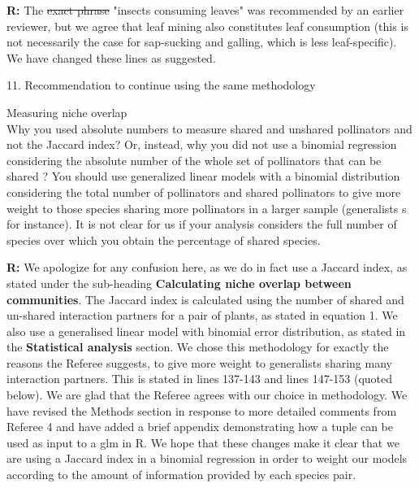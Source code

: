 \documentclass[12pt]{letter}
\newenvironment{refquote}{\bigskip \begin{it}}{\end{it}\smallskip}
\providecommand{\DIFadd}[1]{{\protect\color{blue}\uwave{#1}}} %
\providecommand{\DIFdel}[1]{{\protect\color{red}\sout{#1}}}                      %
\providecommand{\DIFaddbegin}{} %
\providecommand{\DIFaddend}{} %
\providecommand{\DIFdelbegin}{} %
\providecommand{\DIFdelend}{} %
\newcommand{\DIFscaledelfig}{0.5}
\newlength{\DIFdelgraphicswidth} %
\newlength{\DIFdelgraphicsheight} %
\newcommand{\DIFaddincludegraphics}[2][]{{\color{blue}\fbox{\DIFOincludegraphics[#1]{#2}}}} %
\newcommand{\DIFdelincludegraphics}[2][]{%
\sbox{\DIFdelgraphicsbox}{\DIFOincludegraphics[#1]{#2}}%
\settoboxwidth{\DIFdelgraphicswidth}{\DIFdelgraphicsbox} %
\settoboxtotalheight{\DIFdelgraphicsheight}{\DIFdelgraphicsbox} %
\scalebox{\DIFscaledelfig}{%
\parbox[b]{\DIFdelgraphicswidth}{\usebox{\DIFdelgraphicsbox}\\[-\baselineskip] \rule{\DIFdelgraphicswidth}{0em}}\llap{\resizebox{\DIFdelgraphicswidth}{\DIFdelgraphicsheight}{%
\setlength{\unitlength}{\DIFdelgraphicswidth}%
\begin{picture}(1,1)%
\thicklines\linethickness{2pt} %
{\color[rgb]{1,0,0}\put(0,0){\framebox(1,1){}}}%
{\color[rgb]{1,0,0}\put(0,0){\line( 1,1){1}}}%
{\color[rgb]{1,0,0}\put(0,1){\line(1,-1){1}}}%
\end{picture}%
}\hspace*{3pt}}} %
} %
\DeclareRobustCommand{\DIFaddbegin}{\DIFOaddbegin \let\includegraphics\DIFaddincludegraphics} %
\DeclareRobustCommand{\DIFaddend}{\DIFOaddend \let\includegraphics\DIFOincludegraphics} %
\DeclareRobustCommand{\DIFdelbegin}{\DIFOdelbegin \let\includegraphics\DIFdelincludegraphics} %
\DeclareRobustCommand{\DIFdelend}{\DIFOaddend \let\includegraphics\DIFOincludegraphics} %
\begin{document}
		\textbf{R:} The \DIFdelbegin \DIFdel{exact phrase }\DIFdelend \DIFaddbegin \DIFadd{term }\DIFaddend "insects consuming leaves" was recommended by an earlier reviewer, but we agree that leaf mining also constitutes leaf consumption (this is not necessarily the case for sap-sucking and galling, which is less leaf-specific). We have changed these lines as suggested.


	11. Recommendation to continue using the same methodology

		\begin{refquote}
			Measuring niche overlap\\
			Why you used absolute numbers to measure shared and unshared pollinators and not the Jaccard index? Or, instead, why you did not use a binomial regression considering the absolute number of the whole set of pollinators that can be shared ? You should use generalized linear models with a binomial distribution considering the total number of pollinators and shared pollinators to give more weight to those species sharing more pollinators in a larger sample (generalists s for instance). It is not clear for us if your analysis considers the full number of species over which you obtain the percentage of shared species.
		\end{refquote}

		\textbf{R:} We apologize for any confusion here, as we do in fact use a Jaccard index, as stated under the sub-heading \textbf{Calculating niche overlap between communities}.
		The Jaccard index is calculated using the number of shared and un-shared interaction partners for a pair of plants, as stated in equation 1. We also use a generalised linear model with binomial error distribution, as stated in the \textbf{Statistical analysis} section. We chose this methodology for exactly the reasons the Referee suggests, to give more weight to generalists sharing many interaction partners. This is stated in lines 137-143 and lines 147-153 (quoted below). We are glad that the Referee agrees with our choice in methodology. We have revised the Methods section in response to more detailed comments from Referee 4 and have added a brief appendix demonstrating how a tuple can be used as input to a glm in R. We hope that these changes make it clear that we are using a Jaccard index in a binomial regression in order to weight our models according to the amount of information provided by each species pair.
\end{document}
